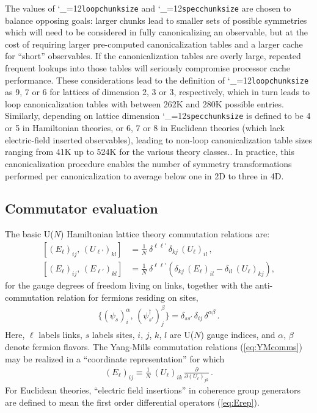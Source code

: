 \documentclass [12pt]{article}
\makeatletter
\renewcommand{\tt}{\begingroup\catcode`_=12\def\_{\string_}\tt@}
\newcommand{\tt@}[1]{\texttt{#1}\endgroup}
\makeatother
\begin{document}
The values of \tt{loopchunksize} and \tt{specchunksize}
are chosen to balance opposing goals:
larger chunks lead to smaller sets of possible symmetries which
will need to be considered in fully canonicalizing an observable,
but at the cost of requiring larger pre-computed canonicalization
tables and a larger cache for ``short'' observables.
If the canonicalization tables are overly large, repeated frequent
lookups into those tables will seriously compromise processor cache
performance.
These considerations lead to the definition of
\tt{loopchunksize} as 9, 7 or 6 for lattices
of dimension 2, 3 or 3, respectively, which in turn
leads to loop canonicalization tables
with between 262K and 280K possible entries.
Similarly, depending on lattice dimension \tt{specchunksize}
is defined to be 4 or 5 in Hamiltonian theories, or 6, 7 or 8
in Euclidean theories (which lack electric-field inserted
observables),
leading to  non-loop canonicalization table sizes ranging from
41K up to 524K for the various theory classes..
In practice, this canonicalization procedure enables the
number of symmetry transformations performed per canonicalization
to average below one in 2D to three in 4D.

\advance\abovedisplayskip -2pt
\advance\belowdisplayskip -2pt
\advance\abovedisplayshortskip -2pt
\advance\belowdisplayshortskip -2pt

\subsection {Commutator evaluation}

The basic U($N$) Hamiltonian lattice theory commutation relations are:
\begin{subequations}\label{eq:YMcomms}
\begin{align}
    [ (E_\ell)_{ij},\, (U_{\ell'})_{kl}]
    &=
    \frac {1}{N} \> \delta^{\ell \ell'} \, \delta_{kj} \, (U_\ell)_{il} \,,
\\
    [ (E_\ell)_{ij},\, (E_{\ell'})_{kl}]
    &=
    \frac {1}{N} \> \delta^{\ell \ell'}
    \left(
	\delta_{kj} \, (E_\ell)_{il} - \delta_{il} \, (U_\ell)_{kj}
    \right),
\end{align}
\end{subequations}
for the gauge degrees of freedom living on links, together with the
anti-commutation relation for fermions residing on sites,
\begin{align}
    \{ (\psi_s)^\alpha_i, \,  (\psi^\dagger_{s'})^\beta_j \}
    =
    \delta_{s s'} \, \delta_{ij} \, \delta^{\alpha\beta} \,.
\end{align}
Here, $\ell$ labels links, $s$ labels sites,
$i$, $j$, $k$, $l$ are U($N$) gauge indices,
and $\alpha$, $\beta$ denote fermion flavors.
The Yang-Mills commutation relations (\ref{eq:YMcomms})
may be realized in a ``coordinate representation'' for which
\begin{align}
    (E_\ell)_{ij} \equiv \frac 1N \> (U_\ell)_{ik} \,\frac {\partial}{\partial (U_\ell)_{jk}} \,.
\label{eq:Erep}
\end{align}
For Euclidean theories, ``electric field insertions'' in
coherence group generators are defined to mean the first order differential
operators (\ref{eq:Erep}).
\end{document}
